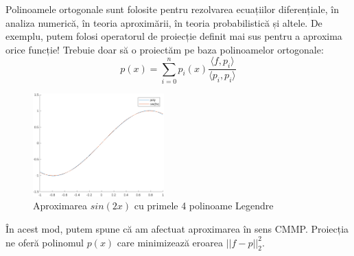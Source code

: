 \documentclass{exam}
\begin{document}
Polinoamele ortogonale sunt folosite pentru rezolvarea ecuațiilor diferențiale, în
analiza numerică, în teoria aproximării, în teoria probabilistică și altele. De
exemplu, putem folosi operatorul de proiecție definit mai sus pentru a aproxima
orice funcție! Trebuie doar să o proiectăm pe baza polinoamelor ortogonale:
\begin{equation*}
	p(x) = \sum_{i = 0}^{n} p_i (x) \frac{\langle f, p_i \rangle}{\langle p_i, p_i \rangle}
\end{equation*}
\begin{figure}[ht]
	\centering
	\includegraphics[width=0.45\textwidth]{legendrefit2}
	\caption{Aproximarea $sin(2x)$ cu primele 4 polinoame Legendre}
	\label{fig:7}
\end{figure}

În acest mod, putem spune că am afectuat aproximarea în sens CMMP. Proiecția ne
oferă polinomul $p(x)$ care minimizează eroarea $||f - p||_2^2$.





\end{document}
